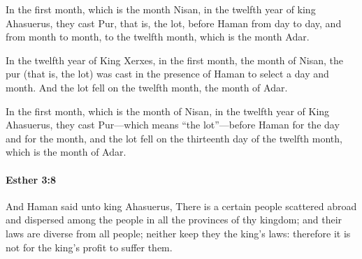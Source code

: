 			\begin{versebox}
					\item[BHS] 
					\item[LXX] 
					\item[ASV] In the first month, which is the month Nisan, in the twelfth year of king Ahasuerus, they cast Pur, that is, the lot, before Haman from day to day, and from month to month, to the twelfth month, which is the month Adar.
					\item[NIV] In the twelfth year of King Xerxes, in the first month, the month of Nisan, the pur (that is, the lot) was cast in the presence of Haman to select a day and month. And the lot fell on the twelfth month, the month of Adar.
					\item[NRSV] In the first month, which is the month of Nisan, in the twelfth year of King Ahasuerus, they cast Pur—which means “the lot”—before Haman for the day and for the month, and the lot fell on the thirteenth day of the twelfth month, which is the month of Adar.
			\end{versebox}

		\paragraph{Esther 3:8} %
			\label{ESTHER-3-8}

			And Haman said unto king Ahasuerus, There is a certain people scattered abroad and dispersed among the people in all the provinces of thy kingdom; and their laws are diverse from all people; neither keep they the king’s laws: therefore it is not for the king’s profit to suffer them.

